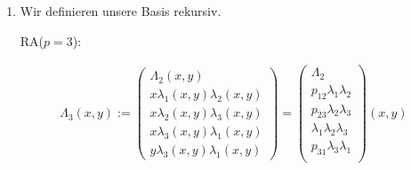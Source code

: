 \begin{solution}
\begin{enumerate}[label = \textbf{\alph*)}]
  \begin{align*}
    \implies
    \underbrace
    {
      \pbraces
      {
        \begin{array}{c|cc|ccc}
        1  &  -1   & -1   &    & & \\
        \hline
          & 1 &    &    & & \\
          &     & 1   &    & & \\
          \hline
          & 1   &    & -1 & -1 & \\
          &     &    &    &  1 & \\
          &     &  1 &  & -1  & -1
        \end{array}
      }
    }_{
      =: T_2 \in \GL(6, \R)
    }
    B_2(x, y)
    =
    \Lambda_2(x, y)
  \end{align*}

  \item Wir definieren unsere Basis rekursiv.

  RA($p = 3$):

  \begin{align*}
    \Lambda_3(x, y)
    :=
    \begin{pmatrix}
      \Lambda_2(x, y) \\
      x \lambda_1(x, y) \lambda_2(x, y) \\
      x \lambda_2(x, y) \lambda_3(x, y) \\
      x \lambda_3(x, y) \lambda_1(x, y) \\
      y \lambda_3(x, y) \lambda_1(x, y)
    \end{pmatrix}
    =
    \begin{pmatrix}
      \Lambda_2 \\
      p_{12} \lambda_1 \lambda_2 \\
      p_{23} \lambda_2 \lambda_3 \\
      \lambda_1 \lambda_2 \lambda_3 \\
      p_{31} \lambda_3 \lambda_1 \\
    \end{pmatrix}
    (x, y)
  \end{align*}


\end{enumerate}
\end{solution}
